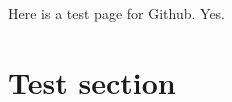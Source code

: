 \documentclass{article}
\begin{document}
Here is a test page for Github. Yes.
\section{Test section}
\end{document}
